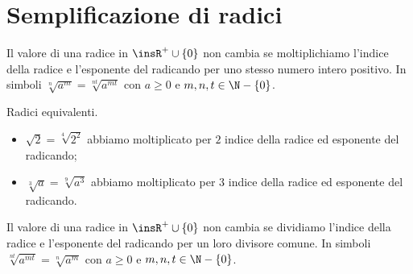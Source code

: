 
\section{Semplificazione di radici}
\label{sec:radici_semplificazione}

\begin{proposizione}
Il valore di una radice in \(\insR^+\cup \{0\}\) non cambia se moltiplichiamo 
l'indice della radice e l'esponente del radicando per uno stesso numero 
intero 
positivo. In simboli \(\sqrt[n]{a^m}=\sqrt[\mathit{nt}]{a^{\mathit{mt}}}\) 
con \(a\ge 0\) e \(m,n,t\in \N-\{0\}\).
\end{proposizione}
\begin{exrig}
 \begin{esempio}
 Radici equivalenti.
 \begin{itemize}
 \item \(\sqrt 2=\sqrt[4]{2^2}\) abbiamo moltiplicato per \(2\) indice della 
  radice ed esponente del radicando;
 \item \(\sqrt[3]a=\sqrt[9]{a^3}\) abbiamo moltiplicato per \(3\) indice 
della 
  radice ed esponente del radicando.
\end{itemize}
 \end{esempio}
\end{exrig}

\begin{proposizione}
Il valore di una radice in \(\insR^+\cup \{0\}\) non cambia se dividiamo 
l'indice della radice e l'esponente del radicando per un loro divisore 
comune. 
In simboli \(\sqrt[nt]{a^{mt}}=\sqrt[n]{a^m}\) con \(a\ge 0\) e 
\(m,n,t\in \N-\{0\}\).
\end{proposizione}

